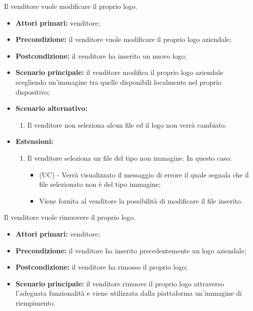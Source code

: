 Il venditore vuole modificare il proprio logo.
\begin{itemize}
    \item \textbf{Attori primari:} venditore;
    \item \textbf{Precondizione:} il venditore vuole modificare il proprio logo aziendale;
    \item \textbf{Postcondizione:} il venditore ha inserito un nuovo logo;
    \item \textbf{Scenario principale:} il venditore modifica il proprio logo aziendale scegliendo un'immagine tra quelle disponibili localmente nel proprio dispositivo;
    \item \textbf{Scenario alternativo:}
    \begin{enumerate}[label=\lett]
    	\item Il venditore non seleziona alcun file ed il logo non verrà cambiato.
    \end{enumerate}
    \item \textbf{Estensioni:}
    \begin{enumerate}[label=\lett]
    	\item Il venditore seleziona un file del tipo non immagine. In questo caso:
    	\begin{itemize}
    		\item (UC) - Verrà visualizzato il messaggio di errore il quale segnala che il file selezionato non è del tipo immagine;
    		\item Viene fornita al venditore la possibilità di modificare il file inserito.
    	\end{itemize}
    \end{enumerate}
\end{itemize}

Il venditore vuole rimuovere il proprio logo.
\begin{itemize}
    \item \textbf{Attori primari:} venditore;
    \item \textbf{Precondizione:} il venditore ha inserito precedentemente un logo aziendale;
    \item \textbf{Postcondizione:} il venditore ha rimosso il proprio logo;
    \item \textbf{Scenario principale:} il venditore rimuove il proprio logo attraverso l'adeguata funzionalità e viene utilizzata dalla piattaforma un'immagine di riempimento.
\end{itemize}

